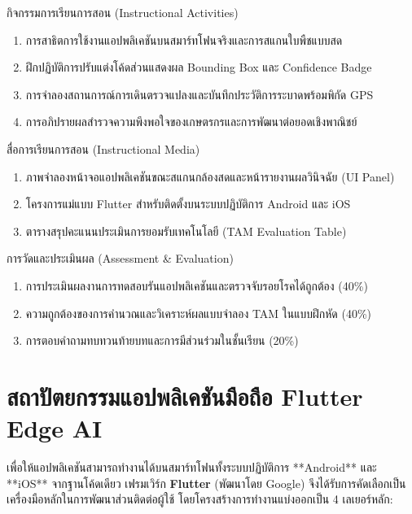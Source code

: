 \begin{planbox}{กิจกรรมการเรียนการสอน (Instructional Activities)}
\begin{enumerate}[leftmargin=1.5em, itemsep=2pt]
    \item การสาธิตการใช้งานแอปพลิเคชันบนสมาร์ทโฟนจริงและการสแกนใบพืชแบบสด
    \item ฝึกปฏิบัติการปรับแต่งโค้ดส่วนแสดงผล Bounding Box และ Confidence Badge
    \item การจำลองสถานการณ์การเดินตรวจแปลงและบันทึกประวัติการระบาดพร้อมพิกัด GPS
    \item การอภิปรายผลสำรวจความพึงพอใจของเกษตรกรและการพัฒนาต่อยอดเชิงพาณิชย์
\end{enumerate}
\end{planbox}

\begin{planbox}{สื่อการเรียนการสอน (Instructional Media)}
\begin{enumerate}[leftmargin=1.5em, itemsep=2pt]
    \item ภาพจำลองหน้าจอแอปพลิเคชันขณะสแกนกล้องสดและหน้ารายงานผลวินิจฉัย (UI Panel)
    \item โครงการแม่แบบ Flutter สำหรับติดตั้งบนระบบปฏิบัติการ Android และ iOS
    \item ตารางสรุปคะแนนประเมินการยอมรับเทคโนโลยี (TAM Evaluation Table)
\end{enumerate}
\end{planbox}

\begin{planbox}{การวัดและประเมินผล (Assessment \& Evaluation)}
\begin{enumerate}[leftmargin=1.5em, itemsep=2pt]
    \item การประเมินผลงานการทดสอบรันแอปพลิเคชันและตรวจจับรอยโรคได้ถูกต้อง (40\%)
    \item ความถูกต้องของการคำนวณและวิเคราะห์ผลแบบจำลอง TAM ในแบบฝึกหัด (40\%)
    \item การตอบคำถามทบทวนท้ายบทและการมีส่วนร่วมในชั้นเรียน (20\%)
\end{enumerate}
\end{planbox}

\clearpage

\section{สถาปัตยกรรมแอปพลิเคชันมือถือ Flutter Edge AI}

เพื่อให้แอปพลิเคชันสามารถทำงานได้บนสมาร์ทโฟนทั้งระบบปฏิบัติการ **Android** และ **iOS** จากฐานโค้ดเดียว เฟรมเวิร์ก \textbf{Flutter} (พัฒนาโดย Google) จึงได้รับการคัดเลือกเป็นเครื่องมือหลักในการพัฒนาส่วนติดต่อผู้ใช้ โดยโครงสร้างการทำงานแบ่งออกเป็น 4 เลเยอร์หลัก:

